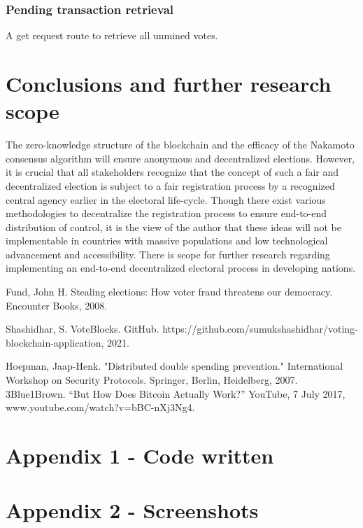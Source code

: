 \documentclass{article}
\begin{document}
    \subsubsection{Pending transaction retrieval}
    A get request route to retrieve all unmined votes.

    \section{Conclusions and further research scope}
    The zero-knowledge structure of the blockchain and the efficacy of the Nakamoto consensus algorithm will ensure anonymous and decentralized elections. However, it is crucial that all stakeholders recognize that the concept of such a fair and decentralized election is subject to a fair registration process by a recognized central agency earlier in the electoral life-cycle. Though there exist various methodologies to decentralize the registration process to ensure end-to-end distribution of control, it is the view of the author that these ideas will not be implementable in countries with massive populations and low technological advancement and accessibility. There is scope for further research regarding implementing an end-to-end decentralized electoral process in developing nations.

    \begin{thebibliography}{9}
        Fund, John H. Stealing elections: How voter fraud threatens our democracy. Encounter Books, 2008.
        
        Shashidhar, S. VoteBlocks. GitHub. https://github.com/sumukshashidhar/voting-blockchain-application, 2021.
        
        Hoepman, Jaap-Henk. "Distributed double spending prevention." International Workshop on Security Protocols. Springer, Berlin, Heidelberg, 2007.
        3Blue1Brown. “But How Does Bitcoin Actually Work?” YouTube, 7 July 2017, www.youtube.com/watch?v=bBC-nXj3Ng4.
    \end{thebibliography}
    \appendix
    \appendixpage
    \addappheadtotoc
    \section*{Appendix 1 - Code written}
    \section*{Appendix 2 - Screenshots}

    
\end{document}
